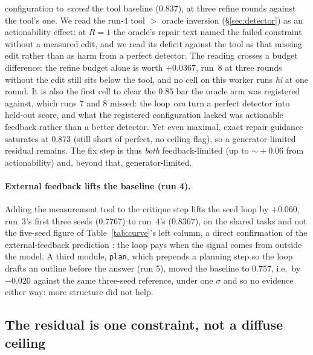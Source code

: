 \documentclass[11pt]{article}
\begin{document}
configuration to \emph{exceed} the tool baseline ($0.837$), at three refine rounds against the
tool's one. We read the run-4 tool
$>$ oracle inversion (\S\ref{sec:detector}) as an actionability effect: at $R{=}1$ the oracle's
repair text named the failed constraint without a measured edit, and we read its deficit against
the tool as that missing edit rather than as harm from a perfect detector. The reading crosses a
budget difference: the refine budget alone is worth $+0.0367$, run~8 at three rounds without the
edit still sits below the tool, and no cell on this worker runs \emph{hi} at one round. It is also the first cell to clear the $0.85$ bar the oracle arm was
registered against, which runs 7 and 8 missed: the loop \emph{can} turn a perfect detector into
held-out score, and what the registered configuration lacked was actionable feedback rather than a
better detector. Yet even maximal, exact repair guidance saturates at $0.873$ (still short of
perfect, no ceiling flag), so a generator-limited residual remains. The fix step is thus
\emph{both} feedback-limited (up to $\sim\!+0.06$ from actionability) and, beyond that,
generator-limited.

\paragraph{External feedback lifts the baseline (run 4).} Adding the measurement tool to the
critique step lifts the seed loop by $+0.060$, run~3's first three seeds ($0.7767$) to run~4's
($0.8367$), on the shared tasks and not the five-seed figure of Table~\ref{tab:curve}'s left
column, a direct confirmation of
the external-feedback prediction \citep{huang2023cannot}: the loop pays when the signal comes
from outside the model.
A third module, \texttt{plan}, which prepends a planning step so the loop drafts an outline
before the answer (run 5), moved the baseline to $0.757$, i.e.\ by $-0.020$ against the
same three-seed reference, under one $\sigma$ and so no evidence either way: more structure
did not help.

\subsection{The residual is one constraint, not a diffuse ceiling}
\label{sec:residual}
\end{document}
